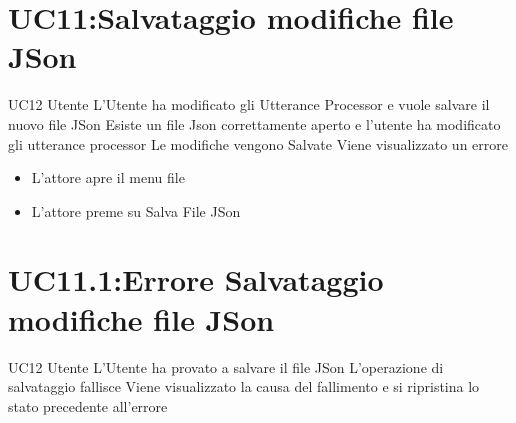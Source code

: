 \documentclass[../AnalisideiRequisiti.tex]{subfiles}
\begin{document}
\section{UC11:Salvataggio modifiche file JSon}
\UserCase
{UC12}
{Utente}
{}
{L'Utente ha modificato gli Utterance Processor e vuole salvare il nuovo file JSon}
{Esiste un file Json correttamente aperto  e l'utente ha modificato gli utterance processor }
{Le modifiche vengono Salvate}
{Viene visualizzato un errore }
{\begin{itemize}
		\item{} L'attore apre il menu file 
		\item{} L'attore preme su Salva File JSon
\end{itemize}
}
\section{UC11.1:Errore Salvataggio modifiche file JSon}
\UserCase
{UC12}
{Utente}
{}
{L'Utente ha provato a salvare il file JSon}
{L'operazione di salvataggio fallisce }
{Viene visualizzato la causa del fallimento e si ripristina lo stato precedente all'errore}
{}
{}
\end{document}
